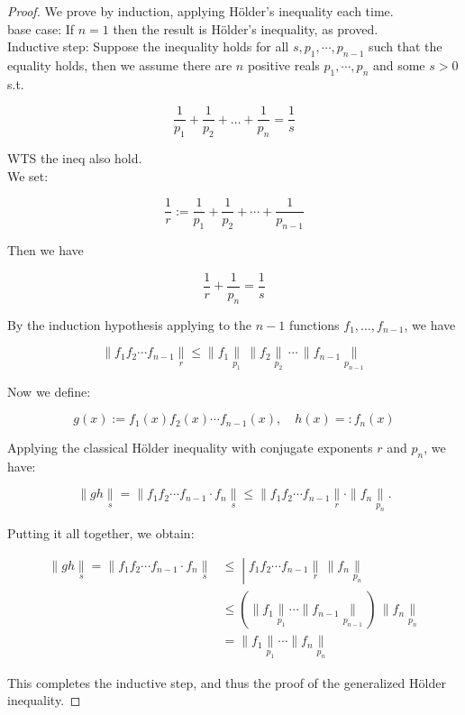 \begin{proof}

We prove by induction, applying Hölder's inequality each time.\\
base case: If \(n = 1\) then the result is Hölder's inequality, as proved.\\
Inductive step: Suppose the inequality holds for all \(s,p_{1},\cdots,p_{n - 1}\) such that the equality holds, then we assume there are \(n\) positive reals \(p_{1},\cdots,p_{n}\) and some \(s > 0\) s.t.

\[\frac{1}{p_{1}} + \frac{1}{p_{2}} + \ldots + \frac{1}{p_{n}} = \frac{1}{s}\]

WTS the ineq also hold.\\
We set:

\[\frac{1}{r} := \frac{1}{p_{1}} + \frac{1}{p_{2}} + \cdots + \frac{1}{p_{n - 1}}\]

Then we have

\[\frac{1}{r} + \frac{1}{p_{n}} = \frac{1}{s}\]

By the induction hypothesis applying to the \(n - 1\) functions \(f_{1},\ldots,f_{n - 1}\), we have

\[\parallel f_{1}f_{2}\cdots f_{n - 1}\underset{r}{\parallel} \leq \parallel f_{1}\underset{p_{1}}{\parallel}\, \parallel f_{2}\underset{p_{2}}{\parallel}\,\cdots\, \parallel f_{n - 1}\underset{p_{n - 1}}{\parallel}\]

Now we define:

\[g(x) := f_{1}(x)f_{2}(x)\cdots f_{n - 1}(x),\quad h(x) = :f_{n}(x)\]

Applying the classical Hölder inequality with conjugate exponents \(r\) and \(p_{n}\), we have:

\[\parallel gh\underset{s}{\parallel} = \parallel f_{1}f_{2}\cdots f_{n - 1} \cdot f_{n}\underset{s}{\parallel} \leq \parallel f_{1}f_{2}\cdots f_{n - 1}\underset{r}{\parallel} \cdot \parallel f_{n}\underset{p_{n}}{\parallel}.\]

Putting it all together, we obtain:

\[\begin{matrix}
{\parallel gh\underset{s}{\parallel} = \parallel f_{1}f_{2}\cdots f_{n - 1} \cdot f_{n}\underset{s}{\parallel}} & \left. \leq \middle| f_{1}f_{2}\cdots f_{n - 1}\underset{r}{\parallel}\, \parallel f_{n}\underset{p_{n}}{\parallel} \right. \\
 & {\leq ( \parallel f_{1}\underset{p_{1}}{\parallel}\cdots \parallel f_{n - 1}\underset{p_{n - 1}}{\parallel})\, \parallel f_{n}\underset{p_{n}}{\parallel}} \\
 & {= \parallel f_{1}\underset{p_{1}}{\parallel}\cdots \parallel f_{n}\underset{p_{n}}{\parallel}}
\end{matrix}\]

This completes the inductive step, and thus the proof of the generalized Hölder inequality.

\end{proof}

